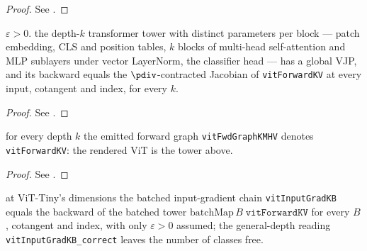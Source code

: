 \begin{proof}
\leanok
See .
\end{proof}

\begin{theorem}
  \label{thm:vitForwardKVHasVJP}
  \leanok
  \Assume{} \(\varepsilon > 0\). \Prove{} the depth-\(k\) transformer tower
  with distinct parameters per block --- patch embedding, CLS and position
  tables, \(k\) blocks of multi-head self-attention and MLP sublayers under
  vector LayerNorm, the classifier head --- has a global VJP, and its backward
  equals the \(\pdiv\)-contracted Jacobian of \texttt{vitForwardKV} at every
  input, cotangent and index, for every \(k\).
\end{theorem}

\begin{proof}
\leanok
See .
\end{proof}

\begin{theorem}
  \label{thm:vitFwdGraphKMHV_faithful}
  \leanok
  \Prove{} for every depth \(k\) the emitted forward graph
  \texttt{vitFwdGraphKMHV} denotes \texttt{vitForwardKV}: the rendered ViT is
  the tower above.
\end{theorem}

\begin{proof}
\leanok
See .
\end{proof}

\begin{theorem}
  \label{thm:vit_whole_back}
  \leanok
  \Prove{} at ViT-Tiny's dimensions the batched input-gradient chain
  \texttt{vitInputGradKB} equals the backward of the batched tower
  \(\mathrm{batchMap}\, B\; \texttt{vitForwardKV}\) for every \(B\), cotangent
  and index, with only \(\varepsilon > 0\) assumed; the general-depth reading
  \texttt{vitInputGradKB\_correct} leaves the number of classes free.
\end{theorem}

